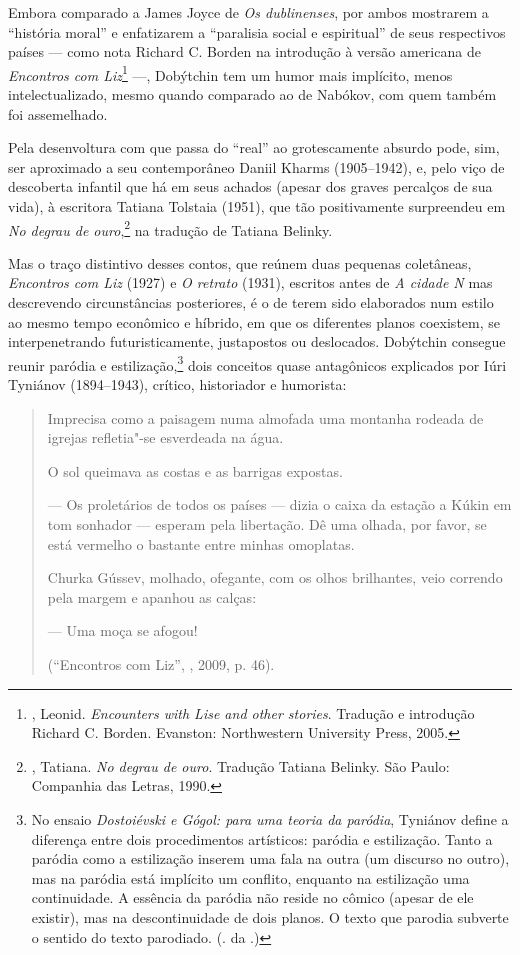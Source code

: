 Embora comparado a James Joyce de \emph{Os dublinenses}, por ambos
mostrarem a ``história moral'' e enfatizarem a ``paralisia social e
espiritual'' de seus respectivos países --- como nota Richard C. Borden
na introdução à versão americana de \emph{Encontros com Liz}\footnote{,
  Leonid. \emph{Encounters with Lise and other stories}. Tradução e
  introdução Richard C. Borden. Evanston: Northwestern University Press,
  2005.} ---, Dobýtchin tem um humor mais implícito, menos
intelectualizado, mesmo quando comparado ao de Nabókov, com quem também
foi assemelhado.

Pela desenvoltura com que passa do ``real'' ao grotescamente absurdo
pode, sim, ser aproximado a seu contemporâneo Daniil Kharms (1905--1942),
e, pelo viço de descoberta infantil que há em seus achados (apesar dos
graves percalços de sua vida), à escritora Tatiana Tolstaia (1951), que
tão positivamente surpreendeu em \emph{No degrau de ouro},\footnote{,
  Tatiana. \emph{No degrau de ouro}. Tradução Tatiana Belinky. São
  Paulo: Companhia das Letras, 1990.} na tradução de Tatiana Belinky.

Mas o traço distintivo desses contos, que reúnem duas pequenas
coletâneas, \emph{Encontros com Liz} (1927) e \emph{O retrato} (1931),
escritos antes de \emph{A cidade N} mas descrevendo circunstâncias
posteriores, é o de terem sido elaborados num estilo ao mesmo tempo
econômico e híbrido, em que os diferentes planos coexistem, se
interpenetrando futuristicamente, justapostos ou deslocados. Dobýtchin
consegue reunir paródia e estilização,\footnote{No ensaio \emph{Dostoiévski e Gógol: para uma teoria da paródia}, Tyniánov define a diferença entre dois procedimentos artísticos: paródia e estilização. Tanto a paródia como a estilização inserem uma fala na outra (um discurso no outro), mas na paródia está implícito um conflito, enquanto na estilização uma continuidade. A essência da paródia não reside no cômico (apesar de ele existir), mas na descontinuidade de dois planos. O texto que parodia subverte o sentido do texto parodiado. (. da .)} dois conceitos quase antagônicos explicados por Iúri Tyniánov (1894--1943), crítico, historiador e
humorista:

\begin{quotation}
Imprecisa como a paisagem numa almofada uma montanha rodeada de igrejas
refletia"-se esverdeada na água.

O sol queimava as costas e as barrigas expostas.

--- Os proletários de todos os países --- dizia o caixa da estação a Kúkin
em tom sonhador --- esperam pela libertação. Dê uma olhada, por favor, se
está vermelho o bastante entre minhas omoplatas.

Churka Gússev, molhado, ofegante, com os olhos brilhantes, veio correndo
pela margem e apanhou as calças:

--- Uma moça se afogou!

(``Encontros com Liz'', , 2009, p. 46).
\end{quotation}

